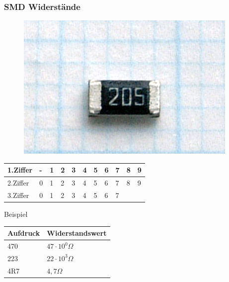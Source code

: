 \begin{frame}
  \frametitle{SMD Widerstände}
  \begin{center}
    \begin{figure}
      \includegraphics[width=\textwidth,height=.2\textheight,keepaspectratio]{e04/Rsistor_SMD.jpg}
    \end{figure}
  \end{center}

  \begin{center}
    \begin{tabular}{l||l|l|l|l|l|l|l|l|l|l}\hline
      1.Ziffer & - & 1 &2 & 3 & 4 & 5 & 6 & 7 & 8 & 9 \\ \hline
      2.Ziffer & 0 & 1 &2 & 3 & 4 & 5 & 6 & 7 & 8 & 9 \\ \hline
      3.Ziffer & 0 & 1 &2 & 3 & 4 & 5 & 6 & 7 &  &  \\ \hline
    \end{tabular}
  \end{center}
  \pause
  \begin{exampleblock}{Beispiel}
    \scriptsize
    \begin{center}
      \begin{tabular}{l|l}
        Aufdruck & Widerstandswert \\ \hline
        470 & $47 \cdot 10^{0} \Omega$ \\
        223 & $22 \cdot 10^{3} \Omega$ \\
        4R7 & $4,7 \Omega$ \\
      \end{tabular}
    \end{center}
  \end{exampleblock}

\end{frame}

